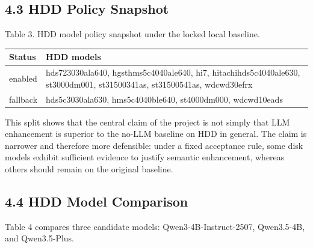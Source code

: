 \documentclass[
  11pt,
  a4paper]{article}
\begin{document}
\hypertarget{hdd-policy-snapshot}{%
\subsection{4.3 HDD Policy Snapshot}\label{hdd-policy-snapshot}}

Table 3. HDD model policy snapshot under the locked local baseline.

\begin{longtable}[]{@{}ll@{}}
\toprule
\begin{minipage}[b]{0.47\columnwidth}\raggedright
Status\strut
\end{minipage} & \begin{minipage}[b]{0.47\columnwidth}\raggedright
HDD models\strut
\end{minipage}\tabularnewline
\midrule
\endhead
\begin{minipage}[t]{0.47\columnwidth}\raggedright
enabled\strut
\end{minipage} & \begin{minipage}[t]{0.47\columnwidth}\raggedright
hds723030ala640, hgsthms5c4040ale640, hi7, hitachihds5c4040ale630,
st3000dm001, st31500341as, st31500541as, wdcwd30efrx\strut
\end{minipage}\tabularnewline
\begin{minipage}[t]{0.47\columnwidth}\raggedright
fallback\strut
\end{minipage} & \begin{minipage}[t]{0.47\columnwidth}\raggedright
hds5c3030ala630, hms5c4040ble640, st4000dm000, wdcwd10eads\strut
\end{minipage}\tabularnewline
\bottomrule
\end{longtable}

This split shows that the central claim of the project is not simply
that LLM enhancement is superior to the no-LLM baseline on HDD in
general. The claim is narrower and therefore more defensible: under a
fixed acceptance rule, some disk models exhibit sufficient evidence to
justify semantic enhancement, whereas others should remain on the
original baseline.

\hypertarget{hdd-model-comparison}{%
\subsection{4.4 HDD Model Comparison}\label{hdd-model-comparison}}

Table 4 compares three candidate models: Qwen3-4B-Instruct-2507,
Qwen3.5-4B, and Qwen3.5-Plus.
\end{document}
